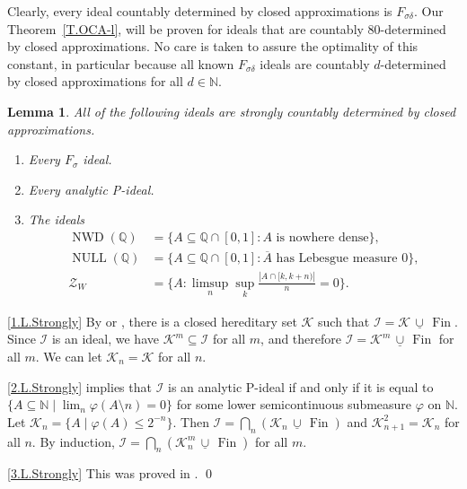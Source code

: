 \documentclass{amsart}
\makeatletter
\def\Fin{{\rm Fin}}   %
\def\text{\mbox}
\newtheorem{lemma}[proposition]{Lemma}
\theoremstyle{definition}
\theoremstyle{remark}
\newcommand{\ucup}{\,\underline{\cup}\,}
\def\Fin{\operatorname{Fin}}
\newcommand{\cK}{{\mathcal K}}
\renewcommand{\proofname}{Proof}
\renewenvironment{proof}[1][\proofname]{\par
\let\oldqedsymbol\qedsymbol             %
  \normalfont
  \topsep6\p@\@plus6\p@ \trivlist
  \item[\hskip\labelsep\hskip\parindent\scshape
    #1\@addpunct{.}]\ignorespaces
}{%
  \qed\endtrivlist
\global\let\qedsymbol\oldqedsymbol      %
}
\newcommand{\bbN}{\mathbb N}
\newcommand{\bbQ}{\mathbb Q}
\newcommand{\cI}{{\mathcal I}} %
\newcommand{\cZ}{\mathcal Z}
\DeclareMathOperator{\NWD}{NWD}
\DeclareMathOperator{\NULL}{NULL}
\numberwithin{claim}{subsection}
\makeatother
\begin{document}
	Clearly, every ideal countably determined by closed approximations
is $F_{\sigma\delta}$.
Our Theorem~\ref{T.OCA-l}, will be proven
for ideals that are countably 80-determined by closed approximations.
No care is taken to assure the optimality of this constant, in particular because all known $F_{\sigma\delta}$ ideals are countably 
$d$-determined by closed approximations for all $d\in \bbN$.  

\begin{lemma} \label{L.StronglyCountablyDetermined}All of the following ideals are strongly countably determined by closed approximations. 
	\label{L.SolMa}
	\begin{enumerate}
		\item  \label{1.L.Strongly} Every $F_\sigma$ ideal.%
		\item\label{2.L.Strongly}  Every analytic P-ideal. %
		\item \label{3.L.Strongly} The ideals %
		\begin{align*}
	\NWD( \bbQ)&=\{A\subseteq  \bbQ\cap [0,1]: A\text{ is nowhere dense}\},\\
	\NULL( \bbQ)&=\{A\subseteq  \bbQ\cap [0,1]: \overline A\text{ has Lebesgue measure 0}\}, \\
	\cZ_W&=\biggl\{A: \limsup_n \sup_k \frac{|A\cap [k,k+n)|}n=0\biggr\}.
\end{align*}		
	\end{enumerate}
\end{lemma}

\begin{proof}
	\eqref{1.L.Strongly} 	By \cite[Lemma 6.3]{Laf:Forcing} or 
	\cite[Lemma 1.2(c)]{Maz:F-sigma}, there is a closed hereditary set $\cK$ such that $\cI=\cK\ucup \Fin$.  Since $\cI$ is an ideal, we have $\cK^m\subseteq \cI$ for all $m$, and therefore $\cI=\cK^m\ucup \Fin$ for all $m$. We can let $\cK_n=\cK$ for all $n$. 
	
	
	\eqref{2.L.Strongly} \cite[Theorem~3.1]{Sol:AnalyticII} implies that 
	$\cI$ is an analytic P-ideal if  and only if it is equal to $\{A\subseteq \bbN\mid \lim_n \varphi(A\setminus n)=0\}$ for
	some lower semicontinuous submeasure $\varphi$ on $\bbN$. Let $\cK_n=\{A\mid  \varphi(A)\leq 2^{-n}\}$. Then $\cI=\bigcap_n (\cK_n\ucup \Fin)$ and $\cK_{n+1}^2=\cK_{n}$ for all $n$. By induction, $\cI=\bigcap_n (\cK_n^m\ucup \Fin)$ for all $m$. 

\eqref{3.L.Strongly} This was proved in \cite[Lemma~2.6]{Fa:Luzin}. 
\end{proof}
\end{document}
